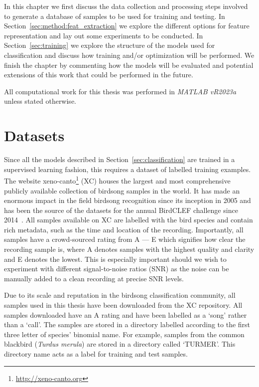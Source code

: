In this chapter we first discuss the data collection and processing steps
involved to generate a database of samples to be used for training and testing.
In Section~\ref{sec:method:feat_extraction} we explore the different options for
feature representation and lay out some experiments to be conducted. In
Section~\ref{sec:training} we explore the structure of the models used for
classification and discuss how training and/or optimization will be performed.
We finish the chapter by commenting how the models will be evaluated and
potential extensions of this work that could be performed in the future.

All computational work for this thesis was performed in \textit{MATLAB vR2023a}
unless stated otherwise.

\section{Datasets}

Since all the models described in Section~\ref{sec:classification} are trained
in a supervised learning fashion, this requires a dataset of labelled training
examples. The website xeno-canto\footnote{\url{http://xeno-canto.org}} (XC) houses the
largest and most comprehensive publicly available collection of birdsong samples
in the world. It has made an enormous impact in the field birdsong recognition
since its inception in 2005 and has been the source of the datasets for the
annual BirdCLEF challenge since 2014~\cite{vellinga2015xeno}. All samples
available on XC are labelled with the bird species and contain rich metadata,
such as the time and location of the recording. Importantly, all samples have a
crowd-sourced rating from A --- E which signifies how clear the recording sample
is, where A denotes samples with the highest quality and clarity and E denotes
the lowest. This is especially important should we wish to experiment with
different signal-to-noise ratios (SNR) as the noise can be manually added to a
clean recording at precise SNR levels.

Due to its scale and reputation in the birdsong classification community, all
samples used in this thesis have been downloaded from the XC repository. All
samples downloaded have an A rating and have been labelled as a `song' rather
than a `call'. The samples are stored in a directory labelled according to the
first three letter of species' binomial name. For example, samples from the
common blackbird (\textit{Turdus merula}) are stored in a directory called
`TURMER'. This directory name acts as a label for training and test samples.


